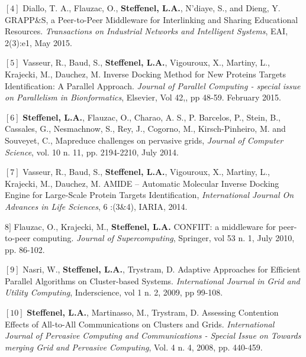 \documentclass[final,twoside]{hdr} %
\begin{document}
\vspace{1em} \noindent $[4]$
Diallo, T. A., Flauzac, O., {\bf Steffenel, L.A.}, N’diaye, S., and Dieng, Y. {GRAPP\&S, a Peer-to-Peer Middleware for Interlinking and Sharing Educational Resources}. {\em Transactions on Industrial Networks and Intelligent Systems}, EAI, 2(3):e1, May 2015. 

\vspace{1em} \noindent $[5]$
Vasseur, R., Baud, S., {\bf Steffenel, L.A.}, Vigouroux, X., Martiny, L., Krajecki, M., Dauchez, M. {Inverse Docking Method for New Proteins Targets Identification: A Parallel Approach}. {\em Journal of Parallel Computing - special issue on Parallelism in Bionformatics}, Elsevier, Vol 42,, pp 48-59. February 2015. 

\vspace{1em} \noindent $[6]$
{\bf Steffenel, L.A.}, Flauzac, O., Charao, A. S., P. Barcelos, P., Stein, B., Cassales, G., Nesmachnow, S., Rey, J., Cogorno, M., Kirsch-Pinheiro, M. and Souveyet, C., {Mapreduce challenges on pervasive grids}, {\em Journal of Computer Science}, vol. 10 n. 11, pp. 2194-2210, July 2014. 

\vspace{1em} \noindent $[7]$
Vasseur, R., Baud, S., {\bf Steffenel, L.A.}, Vigouroux, X., Martiny, L., Krajecki, M., Dauchez, M.  {AMIDE – Automatic Molecular Inverse Docking Engine for Large-Scale Protein Targets Identification}, {\em International Journal On Advances in Life Sciences}, 6 :(3\&4), IARIA, 2014.

\vspace{1em} \noindent $8]$
Flauzac, O., Krajecki, M., {\bf Steffenel, L.A.} {CONFIIT: a middleware for peer-to-peer computing}. {\em Journal of Supercomputing}, Springer, vol 53 n. 1, July 2010, pp. 86-102. 

\vspace{1em} \noindent $[9]$
Nasri, W., {\bf Steffenel, L.A.}, Trystram, D. {Adaptive Approaches for Efficient Parallel Algorithms on Cluster-based Systems}. {\em International Journal in Grid and Utility Computing}, Inderscience, vol 1 n. 2, 2009, pp 99-108. 

\vspace{1em} \noindent $[10]$
{\bf Steffenel, L.A.}, Martinasso, M., Trystram, D. {Assessing Contention Effects of All-to-All Communications on Clusters and Grids}. {\em International Journal of Pervasive Computing and Communications - Special Issue on Towards merging Grid and Pervasive Computing}, Vol. 4 n. 4, 2008, pp. 440-459. 
\end{document}

